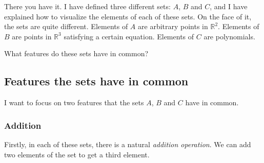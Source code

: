\documentclass[a4paper,11pt]{book}
\theoremstyle{definition}
\begin{document}
There you have it. I have defined three different sets: $A$, $B$ and $C$, and I have explained how to visualize the elements of each of these sets. On the face of it, the sets are quite different. Elements of $A$ are arbitrary points in $\mathbb{R}^2$. Elements of $B$ are points in $\mathbb{R}^3$ satisfying a certain equation. Elements of $C$ are polynomials.

What features do these sets have in common? 

\subsection{Features the sets have in common}
I want to focus on two features that the sets $A$, $B$ and $C$ have in common. 

\subsubsection{Addition}

Firstly, in each of these sets, there is a natural {\em addition operation}. We can add two elements of the set to get a third element. 
\end{document}
